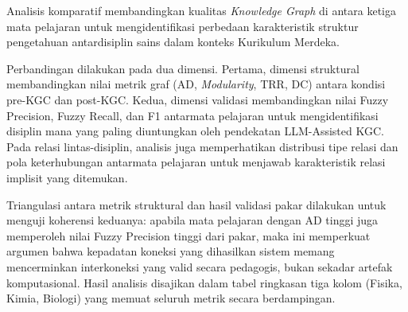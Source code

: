 \documentclass[../../thesis]{subfiles}
\begin{document}
Analisis komparatif membandingkan kualitas \textit{Knowledge Graph} di
antara ketiga mata pelajaran untuk mengidentifikasi perbedaan
karakteristik struktur pengetahuan antardisiplin sains dalam konteks
Kurikulum Merdeka.

Perbandingan dilakukan pada dua dimensi. Pertama, dimensi struktural
membandingkan nilai metrik graf (AD, \textit{Modularity}, TRR, DC) antara
kondisi pre-KGC dan post-KGC.
Kedua, dimensi validasi membandingkan nilai Fuzzy Precision, Fuzzy Recall, dan F1
antarmata pelajaran untuk mengidentifikasi disiplin mana yang paling
diuntungkan oleh pendekatan LLM-Assisted KGC.
Pada relasi lintas-disiplin, analisis juga memperhatikan distribusi tipe relasi
dan pola keterhubungan antarmata pelajaran untuk menjawab karakteristik relasi
implisit yang ditemukan.

Triangulasi antara metrik struktural dan hasil validasi pakar dilakukan
untuk menguji koherensi keduanya: apabila mata pelajaran dengan AD
tinggi juga memperoleh nilai Fuzzy Precision tinggi dari pakar,
maka ini memperkuat argumen bahwa kepadatan koneksi yang dihasilkan
sistem memang mencerminkan interkoneksi yang valid secara pedagogis,
bukan sekadar artefak komputasional. Hasil analisis disajikan dalam
tabel ringkasan tiga kolom (Fisika, Kimia, Biologi) yang memuat seluruh
metrik secara berdampingan.

\ifSubfilesClassLoaded{\printbibliography[title={Daftar Pustaka}]}{}
\end{document}
